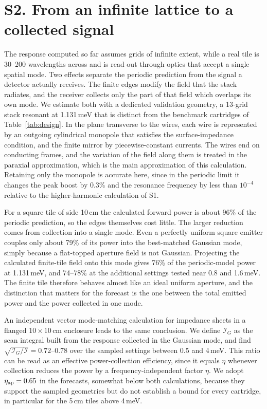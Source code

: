 \documentclass[
  aps,prl,reprint,superscriptaddress,
  amsmath,amssymb,floatfix,nofootinbib
]{revtex4-2}
\begin{document}
\section*{S2. From an infinite lattice to a collected signal}

The response computed so far assumes grids of infinite extent, while a real tile is 30--200 wavelengths across and is read out through optics that accept a single spatial mode. Two effects separate the periodic prediction from the signal a detector actually receives. The finite edges modify the field that the stack radiates, and the receiver collects only the part of that field which overlaps its own mode. We estimate both with a dedicated validation geometry, a 13-grid stack resonant at 1.131\,meV that is distinct from the benchmark cartridges of Table~\ref{tab:design}. In the plane transverse to the wires, each wire is represented by an outgoing cylindrical monopole that satisfies the surface-impedance condition, and the finite mirror by piecewise-constant currents. The wires end on conducting frames, and the variation of the field along them is treated in the paraxial approximation, which is the main approximation of this calculation. Retaining only the monopole is accurate here, since in the periodic limit it changes the peak boost by 0.3\% and the resonance frequency by less than $10^{-4}$ relative to the higher-harmonic calculation of S1.

For a square tile of side 10\,cm the calculated forward power is about 96\% of the periodic prediction, so the edges themselves cost little. The larger reduction comes from collection into a single mode. Even a perfectly uniform square emitter couples only about 79\% of its power into the best-matched Gaussian mode, simply because a flat-topped aperture field is not Gaussian. Projecting the calculated finite-tile field onto this mode gives 76\% of the periodic-model power at 1.131\,meV, and 74--78\% at the additional settings tested near 0.8 and 1.6\,meV. The finite tile therefore behaves almost like an ideal uniform aperture, and the distinction that matters for the forecast is the one between the total emitted power and the power collected in one mode.

An independent vector mode-matching calculation for impedance sheets in a flanged $10\times10$\,cm enclosure leads to the same conclusion. We define $\mathcal I_G$ as the scan integral built from the response collected in the Gaussian mode, and find $\sqrt{\mathcal I_G/\mathcal I}=0.72$--0.78 over the sampled settings between 0.5 and 4\,meV. This ratio can be read as an effective power-collection efficiency, since it equals $\eta$ whenever collection reduces the power by a frequency-independent factor $\eta$. We adopt $\eta_{\rm ap}=0.65$ in the forecasts, somewhat below both calculations, because they support the sampled geometries but do not establish a bound for every cartridge, in particular for the 5\,cm tiles above 4\,meV.
\end{document}

